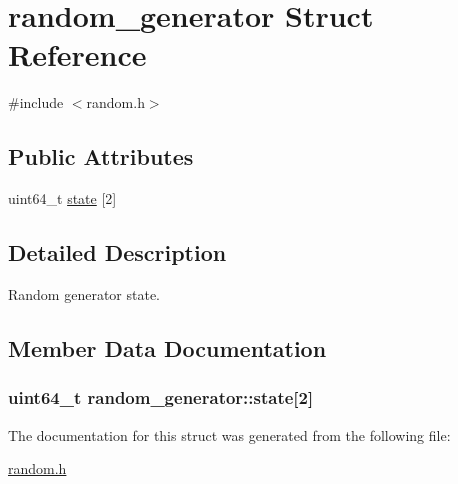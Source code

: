 \hypertarget{structrandom__generator}{}\section{random\+\_\+generator Struct Reference}
\label{structrandom__generator}


{\ttfamily \#include $<$random.\+h$>$}

\subsection*{Public Attributes}
\begin{DoxyCompactItemize}
\item 
uint64\+\_\+t \hyperlink{structrandom__generator_a63822a6b9a9af9b8bf0a0ac15927de2a}{state} \mbox{[}2\mbox{]}
\end{DoxyCompactItemize}


\subsection{Detailed Description}
Random generator state. 

\subsection{Member Data Documentation}
\hypertarget{structrandom__generator_a63822a6b9a9af9b8bf0a0ac15927de2a}{}
\subsubsection[{state}]{\setlength{\rightskip}{0pt plus 5cm}uint64\+\_\+t random\+\_\+generator\+::state\mbox{[}2\mbox{]}}\label{structrandom__generator_a63822a6b9a9af9b8bf0a0ac15927de2a}


The documentation for this struct was generated from the following file\+:\begin{DoxyCompactItemize}
\item 
\hyperlink{random_8h}{random.\+h}\end{DoxyCompactItemize}
